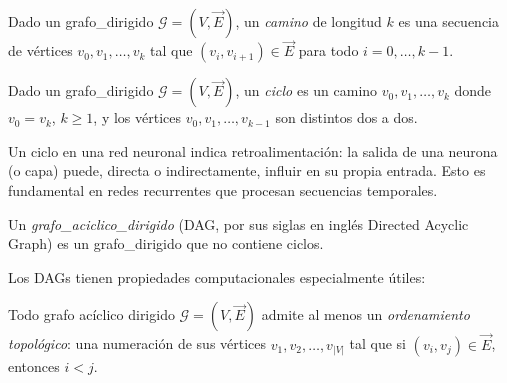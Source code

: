 \begin{definition}\label{def:camino}
Dado un \gls{grafo_dirigido} $\mathcal{G} = (V, \vec{E})$, un \textit{camino} de longitud $k$ es una secuencia de vértices $v_0, v_1, \ldots, v_k$ tal que $(v_i, v_{i+1}) \in \vec{E}$ para todo $i = 0, \ldots, k-1$.
\end{definition}

\begin{definition}\label{def:ciclo}
Dado un \gls{grafo_dirigido} $\mathcal{G} = (V, \vec{E})$, un \textit{ciclo} es un camino $v_0, v_1, \ldots, v_k$ donde $v_0 = v_k$, $k \geq 1$, y los vértices $v_0, v_1, \ldots, v_{k-1}$ son distintos dos a dos.
\end{definition}

Un ciclo en una red neuronal indica retroalimentación: la salida de una neurona (o capa) puede, directa o indirectamente, influir en su propia entrada. Esto es fundamental en redes recurrentes que procesan secuencias temporales.

\begin{definition}\label{def:dag}
Un \textit{\gls{grafo_aciclico_dirigido}} (DAG, por sus siglas en inglés Directed Acyclic Graph) es un \gls{grafo_dirigido} que no contiene ciclos.
\end{definition}

Los \glspl{DAG} tienen propiedades computacionales especialmente útiles:

\begin{theorem}\label{thm:ordenamiento_topologico}
Todo grafo acíclico dirigido $\mathcal{G} = (V, \vec{E})$ admite al menos un \textit{ordenamiento topológico}: una numeración de sus vértices $v_1, v_2, \ldots, v_{|V|}$ tal que si $(v_i, v_j) \in \vec{E}$, entonces $i < j$.
\end{theorem}

